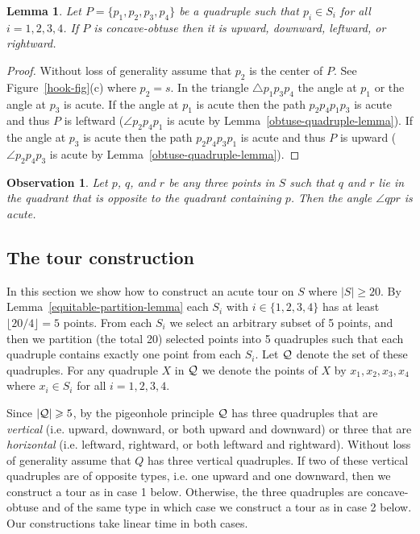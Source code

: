 \documentclass[11pt,letter]{article}
\newtheorem{lemma}{Lemma}
\newtheorem{observation}{Observation}
\begin{document}
\begin{lemma}
	\label{obtuse-quadruple-lemma2}
	Let $P=\{p_1,p_2,p_3,p_4\}$ be a quadruple such that $p_i\in S_i$ for all $i=1,2,3,4$. If $P$ is concave-obtuse then it is upward, downward, leftward, or rightward. 
\end{lemma}
\begin{proof}
	Without loss of generality assume that $p_2$ is the center of $P$. See Figure~\ref{hook-fig}(c) where $p_2=s$. In the triangle $\bigtriangleup p_1p_3p_4$ the angle at $p_1$ or the angle at $p_3$ is acute. If the angle at $p_1$ is acute then the path $p_2p_4p_1p_3$ is acute and thus $P$ is leftward ($\angle p_2p_4p_1$ is acute by Lemma~\ref{obtuse-quadruple-lemma}). If the angle at $p_3$ is acute then the path $p_2p_4p_3p_1$ is acute and thus $P$ is upward ($\angle p_2p_4p_3$ is acute by Lemma~\ref{obtuse-quadruple-lemma}).
\end{proof}


\begin{observation}
\label{opposite-quadrantobs}
Let $p$, $q$, and $r$ be any three points in $S$ such that $q$ and $r$ lie in the quadrant that is opposite to the quadrant containing $p$. Then the angle $\angle qpr$ is acute.
\end{observation}
\subsection{The tour construction}
\label{tour-section}
In this section we show how to construct an acute tour on $S$ where $|S|\geqslant 20$. By Lemma~\ref{equitable-partition-lemma} each $S_i$ with $i\in\{1,2,3,4\}$ has at least $\lfloor 20/4\rfloor=5$ points. From each $S_i$ we select an arbitrary subset of 5 points, and then we partition (the total 20) selected points into 5 quadruples such that each quadruple contains exactly one point from each $S_i$. Let $\cal Q$ denote the set of these quadruples. For any quadruple $X$ in $\cal Q$ we denote the points of $X$ by $x_1,x_2,x_3,x_4$ where $x_i\in S_i$ for all $i=1,2,3,4$. 

Since $|{\cal Q}|\geqslant 5$, by the pigeonhole principle $\cal Q$
 has three quadruples that are {\em vertical} (i.e. upward, downward, or both upward and downward) or three that are {\em horizontal} (i.e. leftward, rightward, or both leftward and rightward). Without loss of generality assume that $Q$ has three vertical quadruples. If two of these vertical quadruples are of opposite types, i.e. one upward and one downward, then we construct a tour as in case 1 below. Otherwise, the three quadruples are concave-obtuse and of the same type in which case we construct a tour as in case 2 below. Our constructions take linear time in both cases.  
\end{document}
